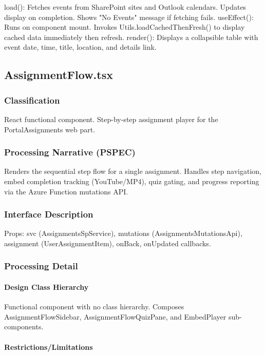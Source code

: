 \documentclass[12pt]{article}
\begin{document}
load(): Fetches events from SharePoint sites and Outlook calendars. Updates display on completion. Shows "No Events" message if fetching fails. useEffect(): Runs on component mount. Invokes Utils.loadCachedThenFresh() to display cached data immediately then refresh. render(): Displays a collapsible table with event date, time, title, location, and details link.

\subsection{AssignmentFlow.tsx}

\subsubsection{Classification}

React functional component. Step-by-step assignment player for the PortalAssignments web part.

\subsubsection{Processing Narrative (PSPEC)}

Renders the sequential step flow for a single assignment. Handles step navigation, embed completion tracking (YouTube/MP4), quiz gating, and progress reporting via the Azure Function mutations API.

\subsubsection{Interface Description}

Props: svc (AssignmentsSpService), mutations (AssignmentsMutationsApi), assignment (UserAssignmentItem), onBack, onUpdated callbacks.

\subsubsection{Processing Detail}

\paragraph{Design Class Hierarchy}

Functional component with no class hierarchy. Composes AssignmentFlowSidebar, AssignmentFlowQuizPane, and EmbedPlayer sub-components.

\paragraph{Restrictions/Limitations}
\end{document}
